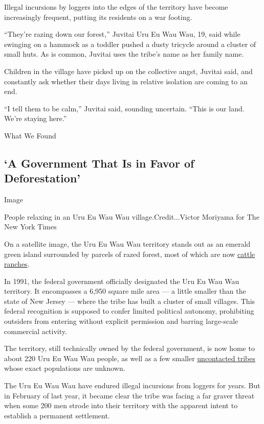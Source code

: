 Illegal incursions by loggers into the edges of the territory have
become increasingly frequent, putting its residents on a war footing.

``They're razing down our forest,'' Juvitai Uru Eu Wau Wau, 19, said
while swinging on a hammock as a toddler pushed a dusty tricycle around
a cluster of small huts. As is common, Juvitai uses the tribe's name as
her family name.

Children in the village have picked up on the collective angst, Juvitai
said, and constantly ask whether their days living in relative isolation
are coming to an end.

``I tell them to be calm,'' Juvitai said, sounding uncertain. ``This is
our land. We're staying here.''

What We Found

\hypertarget{a-government-that-is-in-favor-of-deforestation}{%
\subsection{`A Government That Is in Favor of
Deforestation'}\label{a-government-that-is-in-favor-of-deforestation}}

Image

People relaxing in an Uru Eu Wau Wau village.Credit...Victor Moriyama
for The New York Times

On a satellite image, the Uru Eu Wau Wau territory stands out as an
emerald green island surrounded by parcels of razed forest, most of
which are now
\href{https://www.nytimes3xbfgragh.onion/2019/10/10/world/americas/amazon-fires-brazil-cattle.html}{cattle
ranches}.

In 1991, the federal government officially designated the Uru Eu Wau Wau
territory. It encompasses a 6,950 square mile area --- a little smaller
than the state of New Jersey --- where the tribe has built a cluster of
small villages. This federal recognition is supposed to confer limited
political autonomy, prohibiting outsiders from entering without explicit
permission and barring large-scale commercial activity.

The territory, still technically owned by the federal government, is now
home to about 220 Uru Eu Wau Wau people, as well as a few smaller
\href{https://www.nytimes3xbfgragh.onion/2017/09/10/world/americas/brazil-amazon-tribe-killings.html}{uncontacted
tribes} whose exact populations are unknown.

The Uru Eu Wau Wau have endured illegal incursions from loggers for
years. But in February of last year, it became clear the tribe was
facing a far graver threat when some 200 men strode into their territory
with the apparent intent to establish a permanent settlement.


